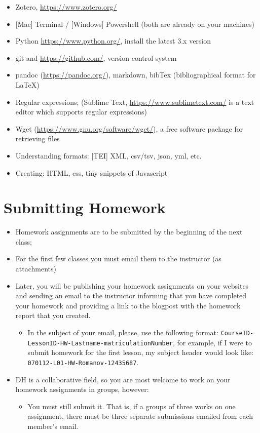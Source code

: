 \documentclass[
]{book}
\providecommand{\tightlist}{%
  \setlength{\itemsep}{0pt}\setlength{\parskip}{0pt}}
\begin{document}
\begin{itemize}
\tightlist
\item
  Zotero, \url{https://www.zotero.org/}
\item
  {[}Mac{]} Terminal / {[}Windows{]} Powershell (both are already on your machines)
\item
  Python \url{https://www.python.org/}, install the latest 3.x version
\item
  git and \url{https://github.com/}, version control system
\item
  pandoc (\url{https://pandoc.org/}), markdown, bibTex (bibliographical format for LaTeX)
\item
  Regular expressions; (Sublime Text, \url{https://www.sublimetext.com/} is a text editor which supports regular expressions)
\item
  Wget (\url{https://www.gnu.org/software/wget/}), a free software package for retrieving files
\item
  Understanding formats: {[}TEI{]} XML, csv/tsv, json, yml, etc.
\item
  Creating: HTML, css, tiny snippets of Javascript
\end{itemize}

\hypertarget{submitting-homework}{%
\section*{Submitting Homework}\label{submitting-homework}}

\begin{itemize}
\tightlist
\item
  Homework assignments are to be submitted by the beginning of the next class;
\item
  For the first few classes you must email them to the instructor (as attachments)
\item
  Later, you will be publishing your homework assignments on your websites and sending an email to the instructor informing that you have completed your homework and providing a link to the blogpost with the homework report that you created.

  \begin{itemize}
  \tightlist
  \item
    In the subject of your email, please, use the following format: \texttt{CourseID-LessonID-HW-Lastname-matriculationNumber}, for example, if I were to submit homework for the first lesson, my subject header would look like: \texttt{070112-L01-HW-Romanov-12435687}.
  \end{itemize}
\item
  DH is a collaborative field, so you are most welcome to work on your homework assignments in groups, however:

  \begin{itemize}
  \tightlist
  \item
    You must still submit it. That is, if a groups of three works on one assignment, there must be three separate submissions emailed from each member's email.
  \end{itemize}
\end{itemize}
\end{document}
